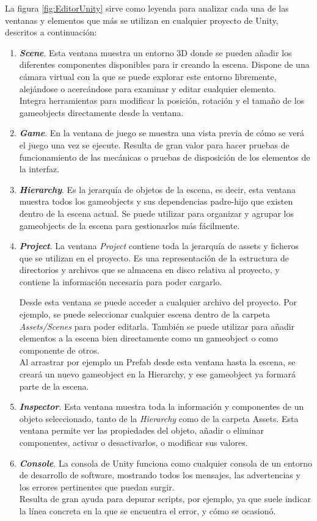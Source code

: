 La figura \ref{fig:EditorUnity} sirve como leyenda para analizar cada una de las ventanas y elementos que más se utilizan en cualquier proyecto de Unity, descritos a continuación:
\begin{enumerate}
    \item \textbf{\textit{Scene}}. Esta ventana muestra un entorno 3D donde se pueden añadir los diferentes componentes disponibles para ir creando la escena. Dispone de una cámara virtual con la que se puede explorar este entorno libremente, alejándose o acercándose para examinar y editar cualquier elemento.\\
    Integra herramientas para modificar la posición, rotación y el tamaño de los gameobjects directamente desde la ventana.
    \item \textbf{\textit{Game}}. En la ventana de juego se muestra una vista previa de cómo se verá el juego una vez se ejecute. Resulta de gran valor para hacer pruebas de funcionamiento de las mecánicas o pruebas de disposición de los elementos de la interfaz.
    \item \textbf{\textit{Hierarchy}}. Es la jerarquía de objetos de la escena, es decir, esta ventana muestra todos los gameobjects y sus dependencias padre-hijo que existen dentro de la escena actual. Se puede utilizar para organizar y agrupar los gameobjects de la escena para gestionarlos más fácilmente.
    \item \textbf{\textit{Project}}. La ventana \textit{Project} contiene toda la jerarquía de assets y ficheros que se utilizan en el proyecto. Es una representación de la estructura de directorios y archivos que se almacena en disco relativa al proyecto, y contiene la información necesaria para poder cargarlo.
    
    Desde esta ventana se puede acceder a cualquier archivo del proyecto. Por ejemplo, se puede seleccionar cualquier escena dentro de la carpeta \textit{Assets/Scenes} para poder editarla. También se  puede utilizar para añadir elementos a la escena bien directamente como un gameobject o como componente de otros.\\
    Al arrastrar por ejemplo un Prefab desde esta ventana hasta la escena, se creará un nuevo gameobject en la Hierarchy, y ese gameobject ya formará parte de la escena.
    \item \textbf{\textit{Inspector}}. Esta ventana muestra toda la información y componentes de un objeto seleccionado, tanto de la \textit{Hierarchy} como de la carpeta Assets. Esta ventana permite ver las propiedades del objeto, añadir o eliminar componentes, activar o desactivarlos, o modificar sus valores.
    \item \textbf{\textit{Console}}. La consola de Unity funciona como cualquier consola de un entorno de desarrollo de software, mostrando todos los mensajes, las advertencias y los errores pertinentes que puedan surgir.\\
    Resulta de gran ayuda para depurar scripts, por ejemplo, ya que suele indicar la línea concreta en la que se encuentra el error, y cómo se ocasionó.
\end{enumerate}
